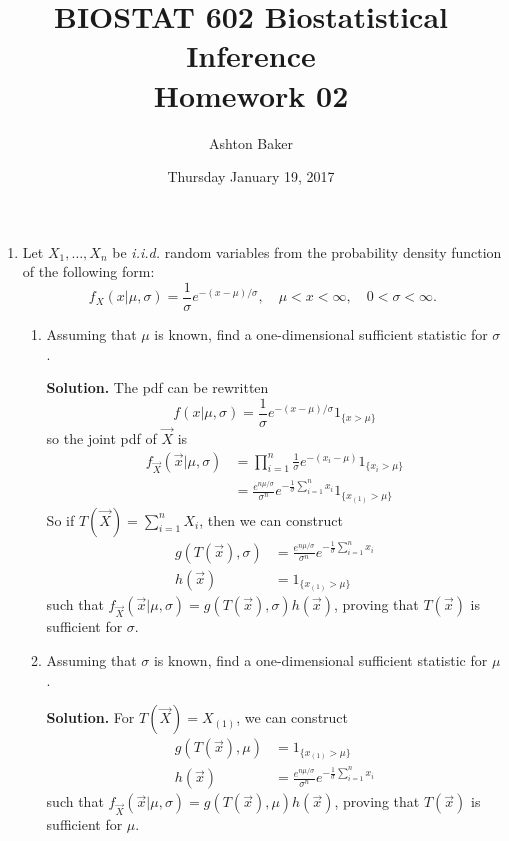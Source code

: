 \documentclass[titlepage]{article}
\begin{document}
\title{BIOSTAT 602 Biostatistical Inference\\Homework 02}
\author{Ashton Baker}
\date{Thursday January 19, 2017}
\maketitle
\begin{enumerate}
\item Let $X_1, \ldots, X_n$ be \emph{i.i.d.} random variables from the probability density function of the following form:
\[f_X(x|\mu,\sigma) = \frac{1}{\sigma}e^{-(x-\mu)/\sigma}, \quad \mu < x < \infty, \quad 0 < \sigma < \infty.\]
  \begin{enumerate}
  \item Assuming that $\mu$ is known, find a one-dimensional sufficient statistic for $\sigma$.

  \textbf{Solution.} The pdf can be rewritten
  \[f(x | \mu, \sigma) = \frac{1}{\sigma}e^{-(x - \mu)/\sigma}1_{\{x > \mu\}}\]
  so the joint pdf of $\vec{X}$ is
  \[\begin{aligned}
  f_\vec{X}(\vec{x}|\mu, \sigma) &= \prod_{i=1}^n \frac{1}{\sigma}e^{-(x_i - \mu)}1_{\{x_i > \mu\}} \\
  &= \frac{e^{n\mu/\sigma}}{\sigma^n} e^{-\frac{1}{\sigma}\sum_{i=1}^n x_i}1_{\{x_{(1)} > \mu\}}
  \end{aligned}\]
  So if $T(\vec{X}) = \sum_{i=1}^n X_i$, then we can construct
  \[\begin{aligned}
  g\left(T(\vec{x}), \sigma\right) &= \frac{e^{n\mu/\sigma}}{\sigma^n} e^{-\frac{1}{\sigma}\sum_{i=1}^n x_i} \\
  h(\vec{x}) &= 1_{\{x_{(1)} > \mu\}}
  \end{aligned}\]
  such that $f_\vec{X}(\vec{x}|\mu, \sigma) = g\left(T(\vec{x}), \sigma\right) h(\vec{x})$, proving that $T(\vec{x})$ is sufficient for $\sigma$.

  \item Assuming that $\sigma$ is known, find a one-dimensional sufficient statistic for $\mu$.

  \textbf{Solution.} For $T(\vec{X}) = X_{(1)}$, we can construct
  \[\begin{aligned}
  g(T(\vec{x}), \mu) &= 1_{\{x_{(1)} > \mu\}} \\
  h(\vec{x}) &= \frac{e^{n\mu/\sigma}}{\sigma^n} e^{-\frac{1}{\sigma}\sum_{i=1}^n x_i}
  \end{aligned}\]
  such that $f_\vec{X}(\vec{x}|\mu, \sigma) = g\left(T(\vec{x}), \mu\right) h(\vec{x})$, proving that $T(\vec{x})$ is sufficient for $\mu$.


\end{enumerate}
\end{enumerate}
\end{document}
